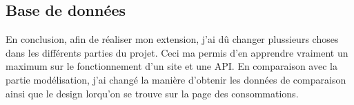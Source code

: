 \subsection{Base de données}

\begin{flushleft}
En conclusion, afin de réaliser mon extension, j'ai dû changer plussieurs choses dans les différents parties du projet. Ceci ma permis d'en apprendre vraiment un maximum sur le fonctionnement d'un site et une API.
En comparaison avec la partie modélisation, j'ai changé la manière d'obtenir les données de comparaison ainsi que le design lorqu'on se trouve sur la page des consommations.
\end{flushleft}

